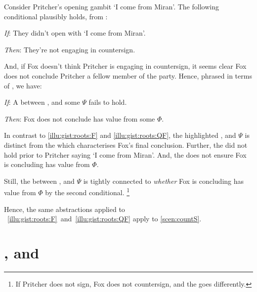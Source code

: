 \begin{note}
  Consider Pritcher's opening gambit `I come from Miran'.
  The following conditional plausibly holds, from :
  \begin{itenum}
  \item[\emph{If}:]
    They didn't open with `I come from Miran'.
  \item[\emph{Then}:]
    They're not engaging in countersign.
  \end{itenum}
  And, if Fox doesn't think Pritcher is engaging in countersign, it seems clear Fox does not conclude Pritcher a fellow member of the party.
  Hence, phrased in terms of , we have:
  \begin{itenum}
  \item[\emph{If}:]
    A \ros{} between ,  and some \pool{} \(\Psi\) fails to hold.
  \item[\emph{Then}:]
    Fox does not conclude  has value  from some \pool{} \(\Phi\).
  \end{itenum}
  In contrast to  \ref{illu:gist:roots:F} and \ref{illu:gist:roots:QF}, the highlighted \ros{} ,  and \(\Psi\) is distinct from the \ros{} which characterises Fox's final conclusion.
  Further, the \ros{} did not hold prior to Pritcher saying `I come from Miran'.
  And, the \ros{} does not ensure Fox is concluding  has value  from \(\Phi\).

  Still, the \ros{} between ,  and \(\Psi\) is tightly connected to \emph{whether} Fox is concluding  has value  from \(\Phi\) by the second conditional.%
  \footnote{
    If Pritcher does not sign, Fox does not countersign, and the \scen{} goes differently.
  }

  Hence, the same abstractions applied to ~\ref{illu:gist:roots:F}~and~\ref{illu:gist:roots:QF} apply to \autoref{scen:countS}.
\end{note}



\section*{\qWhy{}, \qHow{} and \issueInclusion{}}
\label{cha:intro:why-how}



